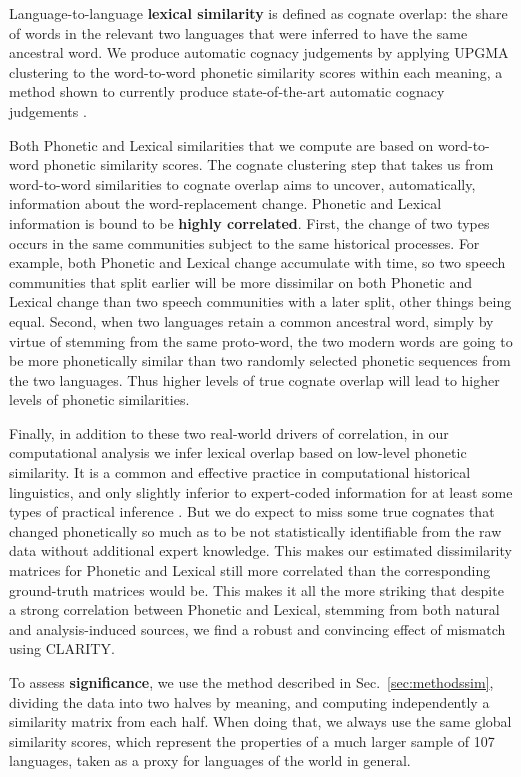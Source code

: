 \documentclass[a4]{article}
\newcommand{\+}[1]{\mathbf{#1}}
\begin{document}
Language-to-language \textbf{lexical similarity} is defined as cognate overlap: the share of words in the relevant two languages that were inferred to have the same ancestral word. We produce automatic cognacy judgements by applying UPGMA clustering to the word-to-word phonetic similarity scores within each meaning, a method shown to currently produce state-of-the-art automatic cognacy judgements \cite{Dellert-2018}. 

Both Phonetic and Lexical similarities that we compute are based on word-to-word phonetic similarity scores. The cognate clustering step that takes us from word-to-word similarities to cognate overlap aims to uncover, automatically, information about the word-replacement change. Phonetic and Lexical information is bound to be \textbf{highly correlated}. First, the change of two types occurs in the same communities subject to the same historical processes. For example, both Phonetic and Lexical change accumulate with time, so two speech communities that split earlier will be more dissimilar on both Phonetic and Lexical change than two speech communities with a later split, other things being equal. Second, when two languages retain a common ancestral word, simply by virtue of stemming from the same proto-word, the two modern words are going to be more phonetically similar than two randomly selected phonetic sequences from the two languages. Thus higher levels of true cognate overlap will lead to higher levels of phonetic similarities. 

Finally, in addition to these two real-world drivers of correlation, in our computational analysis we infer lexical overlap based on low-level phonetic similarity. It is a common and effective practice in computational historical linguistics, and only slightly inferior to expert-coded information for at least some types of practical inference \cite{Rama-et-al-2018}. But we do expect to miss some true cognates that changed phonetically so much as to be not statistically identifiable from the raw data without additional expert knowledge. This makes our estimated dissimilarity matrices for Phonetic and Lexical still more correlated than the corresponding ground-truth matrices would be. This makes it all the more striking that despite a strong correlation between Phonetic and Lexical, stemming from both natural and analysis-induced sources, we find a robust and convincing effect of mismatch using CLARITY. 

To assess \textbf{significance}, we use the method described in Sec.~\ref{sec:methodssim}, dividing the data into two halves by meaning, and computing independently a similarity matrix from each half. When doing that, we always use the same global similarity scores, which represent the properties of a much larger sample of 107 languages, taken as a proxy for languages of the world in general. 
\end{document}
